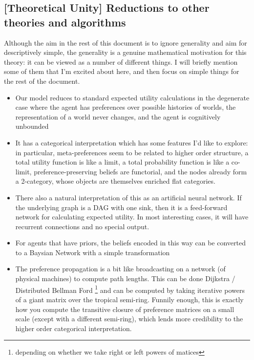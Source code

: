 \documentclass{article}
\begin{document}
	\subsection*{[Theoretical Unity] Reductions to other theories and algorithms}
	Although the aim in the rest of this document is to ignore generality and aim for descriptively simple, the generality is a genuine mathematical motivation for this theory: it can be viewed as a number of different things. I will briefly mention some of them that I'm excited about here, and then focus on simple things for the rest of the document.
	\begin{itemize}[nosep]
		\item Our model reduces to standard expected utility calculations in the degenerate case where the agent has preferences over possible histories of worlds, the representation of a world never changes, and the agent is cognitively unbounded
		\item It has a categorical interpretation which has some features I'd like to explore: in particular, meta-preferences seem to be related to higher order structure, a total utility function is like a limit, a total probability function is like a co-limit, preference-preserving beliefs are functorial, and the nodes already form a 2-category, whose objects are themselves enriched flat categories.
		\item There also a natural interpretation of this as an artificial neural network. If the underlying graph is a DAG with one sink, then it is a feed-forward network for calculating expected utility. In most interesting cases, it will have recurrent connections and no special output.
		\item For agents that have priors, the beliefs encoded in this way can be converted to a Baysian Network with a simple transformation
		\item The preference propagation is a bit like broadcasting on a network (of physical machines) to compute path lengths. This can be done Dijkstra / Distributed Bellman Ford \footnote{depending on whether we take right or left powers of matices} and can be computed by taking iterative powers of a giant matrix over the tropical semi-ring. Funnily enough, this is exactly how you compute the transitive closure of preference matrices on a small scale (except with a different semi-ring), which lends more credibility to the higher order categorical interpretation.
	\end{itemize}
	
\end{document}
